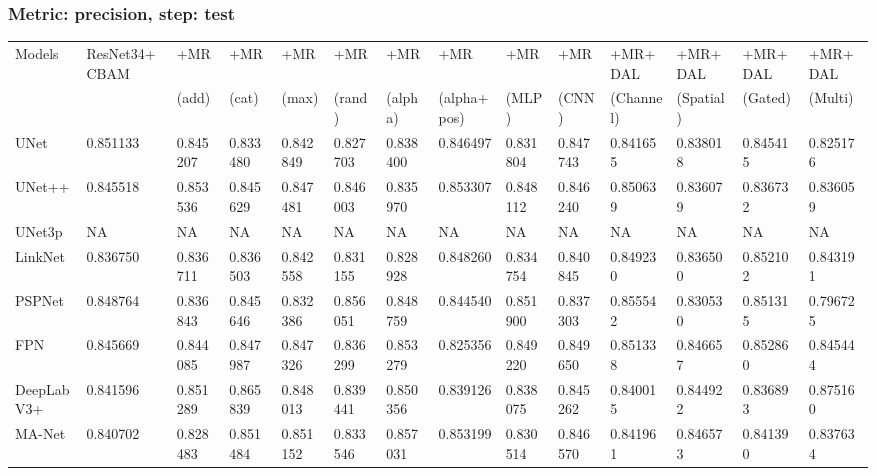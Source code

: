 \documentclass{article}
\begin{document}
\subsubsection{Metric: precision, step: test}
\begin{tabular}{llllllllllllll}
\toprule
Models & ResNet34+CBAM & +MR  & +MR  & +MR  & +MR  & +MR  & +MR  & +MR  & +MR  & +MR+DAL & +MR+DAL & +MR+DAL & +MR+DAL \\
       &             &  (add) &  (cat) &  (max) &  (rand) &  (alpha) &  (alpha+pos) &  (MLP) &  (CNN) & (Channel) & (Spatial) & (Gated) & (Multi) \\
\midrule
UNet & 0.851133 & 0.845207 & 0.833480 & 0.842849 & 0.827703 & 0.838400 & 0.846497 & 0.831804 & 0.847743 & 0.841655 & 0.838018 & 0.845415 & 0.825176 \\
UNet++ & 0.845518 & 0.853536 & 0.845629 & 0.847481 & 0.846003 & 0.835970 & 0.853307 & 0.848112 & 0.846240 & 0.850639 & 0.836079 & 0.836732 & 0.836059 \\
UNet3p & NA & NA & NA & NA & NA & NA & NA & NA & NA & NA & NA & NA & NA \\
LinkNet & 0.836750 & 0.836711 & 0.836503 & 0.842558 & 0.831155 & 0.828928 & 0.848260 & 0.834754 & 0.840845 & 0.849230 & 0.836500 & 0.852102 & 0.843191 \\
PSPNet & 0.848764 & 0.836843 & 0.845646 & 0.832386 & 0.856051 & 0.848759 & 0.844540 & 0.851900 & 0.837303 & 0.855542 & 0.830530 & 0.851315 & 0.796725 \\
FPN & 0.845669 & 0.844085 & 0.847987 & 0.847326 & 0.836299 & 0.853279 & 0.825356 & 0.849220 & 0.849650 & 0.851338 & 0.846657 & 0.852860 & 0.845444 \\
DeepLabV3+ & 0.841596 & 0.851289 & 0.865839 & 0.848013 & 0.839441 & 0.850356 & 0.839126 & 0.838075 & 0.845262 & 0.840015 & 0.844922 & 0.836893 & 0.875160 \\
MA-Net & 0.840702 & 0.828483 & 0.851484 & 0.851152 & 0.833546 & 0.857031 & 0.853199 & 0.830514 & 0.846570 & 0.841961 & 0.846573 & 0.841390 & 0.837634 \\
\bottomrule
\end{tabular}
\end{document}
